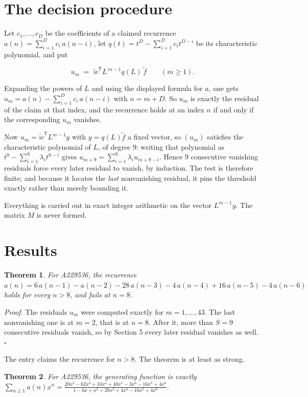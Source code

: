 \documentclass[11pt]{article}
\newtheorem{theorem}{Theorem}
\theoremstyle{definition}
\begin{document}
\section{The decision procedure}

Let $c_1,\dots,c_D$ be the coefficients of a claimed recurrence $a(n) = \sum_{i=1}^{D} c_i\,a(n-i)$, let $q(t) = t^{D} - \sum_{i=1}^{D} c_i t^{D-i}$ be its characteristic polynomial, and put

\[u_m \;=\; \tilde w^{\mathsf T} L^{\,m-1} q(L)\,\tilde f \qquad (m \ge 1).\]

Expanding the powers of $L$ and using the displayed formula for $a$, one gets $u_m = a(n) - \sum_{i=1}^{D} c_i\,a(n-i)$ with $n = m + D$. So $u_m$ is exactly the residual of the claim at that index, and the recurrence holds at an index $n$ if and only if the corresponding $u_m$ vanishes.

Now $u_m = \tilde w^{\mathsf T} L^{m-1} y$ with $y = q(L)\tilde f$ a fixed vector, so $(u_m)$ satisfies the characteristic polynomial of $L$, of degree $9$: writing that polynomial as $t^{9} - \sum_{i=1}^{9} \lambda_i t^{9-i}$ gives $u_{m+9} = \sum_{i=1}^{9} \lambda_i u_{m+9-i}$. Hence $9$ consecutive vanishing residuals force every later residual to vanish, by induction. The test is therefore finite; and because it locates the {\itshape last} nonvanishing residual, it pins the threshold exactly rather than merely bounding it.

Everything is carried out in exact integer arithmetic on the vector $L^{m-1}y$. The matrix $M$ is never formed.

\section{Results}

\begin{theorem} For A229536, the recurrence $a(n) = 6\,a(n-1) - a(n-2) - 28\,a(n-3) - 4\,a(n-4) + 16\,a(n-5) - 4\,a(n-6)$ holds for every $n > 8$, and fails at $n = 8$.\end{theorem}

{\itshape Proof.} The residuals $u_m$ were computed exactly for $m = 1,\dots,43$. The last nonvanishing one is at $m = 2$, that is at $n = 8$. After it, more than $S = 9$ consecutive residuals vanish, so by Section 5 every later residual vanishes as well. $\square$

The entry claims the recurrence for $n > 8$. The theorem is at least as strong.

\begin{theorem} For A229536, the generating function is exactly $\sum_{n\ge 1} a(n)x^n = \frac{20x^{2} - 62x^{3} + 33x^{4} + 40x^{5} - 3x^{6} - 16x^{7} + 4x^{8}}{1 - 6x + x^{2} + 28x^{3} + 4x^{4} - 16x^{5} + 4x^{6}}$.\end{theorem}
\end{document}
